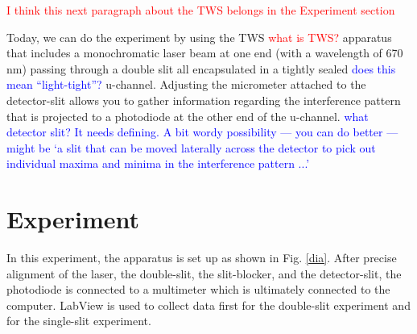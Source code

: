 \documentclass[prb,preprint]{revtex4-1}
\begin{document}
\textcolor{red}{I think this next paragraph about the TWS belongs in the Experiment section}


Today, we can do the experiment by using the TWS \textcolor{red}{what is TWS?} apparatus that includes a monochromatic laser beam at one end (with a wavelength of 670 nm) passing through a double slit all encapsulated in a tightly sealed \textcolor{blue}{does this mean ``light-tight''?} u-channel. Adjusting the micrometer attached to the detector-slit allows you to gather information regarding the interference pattern that is projected to a photodiode at the other end of the u-channel. \textcolor{blue}{what detector slit? It needs defining. A bit wordy possibility --- you can do better --- might be `a slit that can be moved laterally across the detector to pick out individual maxima and minima in the interference pattern ...'}

\section{Experiment}
In this experiment, the apparatus is set up as shown in Fig. \ref{dia}. After precise alignment of the laser, the double-slit, the slit-blocker, and the detector-slit, the photodiode is connected to a multimeter which is ultimately connected to the computer. LabView is used to collect data first for the double-slit experiment and for the single-slit experiment. \\
\end{document}
